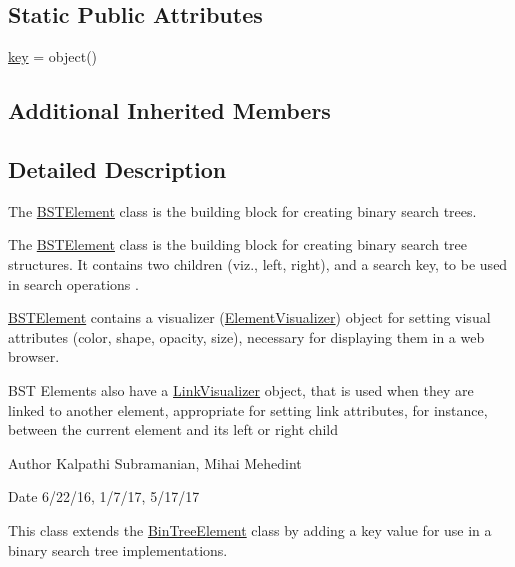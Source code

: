 \subsection*{Static Public Attributes}
\begin{DoxyCompactItemize}
\item 
\mbox{\hyperlink{class_bridges_1_1_b_s_t_element_1_1_b_s_t_element_a2361f6985c8e968645c57ecdb837d000}{key}} = object()
\end{DoxyCompactItemize}
\subsection*{Additional Inherited Members}


\subsection{Detailed Description}
The \mbox{\hyperlink{class_bridges_1_1_b_s_t_element_1_1_b_s_t_element}{B\+S\+T\+Element}} class is the building block for creating binary search trees. 

The \mbox{\hyperlink{class_bridges_1_1_b_s_t_element_1_1_b_s_t_element}{B\+S\+T\+Element}} class is the building block for creating binary search tree structures. It contains two children (viz., left, right), and a search key, to be used in search operations .

\mbox{\hyperlink{class_bridges_1_1_b_s_t_element_1_1_b_s_t_element}{B\+S\+T\+Element}} contains a visualizer (\mbox{\hyperlink{namespace_bridges_1_1_element_visualizer}{Element\+Visualizer}}) object for setting visual attributes (color, shape, opacity, size), necessary for displaying them in a web browser.

B\+ST Elements also have a \mbox{\hyperlink{namespace_bridges_1_1_link_visualizer}{Link\+Visualizer}} object, that is used when they are linked to another element, appropriate for setting link attributes, for instance, between the current element and its left or right child

\begin{DoxyAuthor}{Author}
Kalpathi Subramanian, Mihai Mehedint
\end{DoxyAuthor}
\begin{DoxyDate}{Date}
6/22/16, 1/7/17, 5/17/17
\end{DoxyDate}
This class extends the \mbox{\hyperlink{namespace_bridges_1_1_bin_tree_element}{Bin\+Tree\+Element}} class by adding a \textquotesingle{}key\textquotesingle{} value for use in a binary search tree implementations. 

